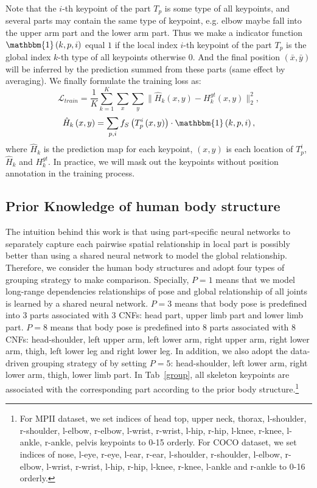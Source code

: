 \documentclass[journal]{IEEEtran}
\begin{document}
Note that the $i$-th keypoint of the part $T_p$ is some type of all keypoints, and several parts may contain the same type of keypoint, e.g. elbow maybe fall into the upper arm part and the lower arm part. Thus we make a indicator function $\mathbbm{1}\left(k,p,i\right)$ equal $1$ if the local index $i$-th keypoint of the part $T_p$ is the global index $k$-th type of all keypoints otherwise $0$. And the final position $(\bar{x},\bar{y})$ will be inferred by the prediction summed from these parts (same effect by averaging). We finally formulate the training loss as:
\begin{equation}
\mathcal{L}_{train} =\frac{1}{K} \sum_{k=1}^K\sum_x \sum_y { \| \hat{H}_k\left( x,y \right) -H_{k}^{gt}\left(x,y \right) \|_2^2 }, 
\end{equation}
\begin{equation}
\hat{H}_k\left( x,y\right) =  \sum_{p,i} f_{S}\left(T_p^i\left( x,y \right) \right)\cdot \mathbbm{1}\left(k,p,i\right),
\end{equation}
where $\hat{H}_k$ is the prediction map for each keypoint, $(x,y)$ is each location of $T_p^i$, $\hat{H}_k$ and $H^{gt}_k$. In practice, we will mask out the keypoints without position annotation in the training process.

\subsection{Prior Knowledge of human body structure}
\label{prior}
The intuition behind this work is that using part-specific neural networks to separately capture each pairwise spatial relationship in local part is possibly better than using a shared neural network to model the global relationship. Therefore, we consider the human body structures and adopt four types of grouping strategy to make comparison. Specially, $P=1$ means that we model long-range dependencies relationships of pose and global relationship of all joints is learned  by a shared neural network. $P=3$ means that body pose is predefined into 3 parts associated with 3 CNFs: head part, upper limb part and lower limb part. $P=8$ means that body pose is predefined into 8 parts associated with 8 CNFs: head-shoulder, left upper arm, left lower arm, right upper arm, right lower arm, thigh, left lower leg and right lower leg. In addition, we also adopt the data-driven grouping strategy of \cite{Tang_2019_CVPR} by setting $P=5$: head-shoulder, left lower arm, right lower arm, thigh, lower limb part. In Tab~\ref{group}, all skeleton keypoints are associated with the corresponding part according to the prior body structure.\footnote{For MPII \cite{andriluka20142d} dataset, we set indices of head top, upper neck, thorax, l-shoulder, r-shoulder, l-elbow, r-elbow, l-wrist, r-wrist, l-hip, r-hip, l-knee, r-knee, l-ankle, r-ankle, pelvis keypoints to 0-15 orderly. For COCO \cite{lin2014microsoft} dataset, we set indices of nose, l-eye, r-eye, l-ear, r-ear, l-shoulder, r-shoulder, l-elbow, r-elbow, l-wrist, r-wrist, l-hip, r-hip, l-knee, r-knee, l-ankle and r-ankle to 0-16 orderly. }
\end{document}
